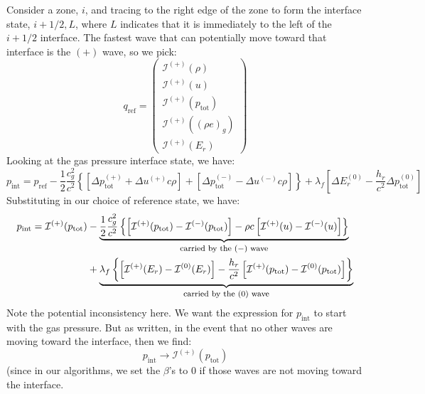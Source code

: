 \documentclass[12pt]{article}
\newcommand{\evm}{{(-)}}
\newcommand{\evz}{{(0)}}
\newcommand{\evp}{{(+)}}
\begin{document}
Consider a zone, $i$, and tracing to the right edge of the zone to
form the interface state, $i+1/2,L$, where $L$ indicates that it is
immediately to the left of the $i+1/2$ interface.  The fastest wave
that can potentially move toward that interface is the $\evp$ wave,
so we pick:
\begin{equation}
q_\mathrm{ref} = \left (
   \begin{array}{c}
     \mathcal{I}^\evp(\rho) \\
     \mathcal{I}^\evp(u) \\
     \mathcal{I}^\evp(p_\mathrm{tot}) \\
     \mathcal{I}^\evp((\rho e)_g) \\
     \mathcal{I}^\evp(E_r)
   \end{array}
\right )
\end{equation}
Looking at the gas pressure interface state, we have:
\begin{equation}
p_\mathrm{int} = p_\mathrm{ref} - \frac{1}{2} \frac{c_g^2}{c^2} \left \{
   \left [ \Delta p_\mathrm{tot}^\evp + \Delta u^\evp c\rho \right ]
 + \left [ \Delta p_\mathrm{tot}^\evm - \Delta u^\evm c\rho \right ] \right \}
 + \lambda_f \left [ \Delta E_r^\evz - \frac{h_r}{c^2} \Delta p^\evz_\mathrm{tot} \right ]
\end{equation}
Substituting in our choice of reference state, we have:
\begin{align}
p_\mathrm{int} = \mathcal{I}^\evp(p_\mathrm{tot}) &- \underbrace{\frac{1}{2} \frac{c_g^2}{c^2} \left \{
 \left [ \mathcal{I}^\evp(p_\mathrm{tot}) - \mathcal{I}^\evm(p_\mathrm{tot}) \right ] 
   - \rho c \left [ \mathcal{I}^\evp(u) - \mathcal{I}^\evm(u) \right ] \right \}}_{\mbox{\footnotesize carried by the $\evm$ wave}} \\
 &+ \underbrace{\lambda_f \left \{ \left [ \mathcal{I}^\evp(E_r) - \mathcal{I}^\evz(E_r) \right ]
   - \frac{h_r}{c^2} \left [ \mathcal{I}^\evp(p_\mathrm{tot}) - \mathcal{I}^\evz(p_\mathrm{tot}) \right ] \right \}}_{\mbox{\footnotesize carried by the $\evz$ wave}}
\end{align}
Note the potential inconsistency here.  We want the expression for
$p_\mathrm{int}$ to start with the gas pressure.  But as written, in the 
event that no other waves are moving toward the interface, then we find:
\begin{equation}
p_\mathrm{int} \rightarrow \mathcal{I}^\evp(p_\mathrm{tot})
\end{equation}
(since in our algorithms, we set the $\beta$'s to $0$ if those waves
are not moving toward the interface.
\end{document}
